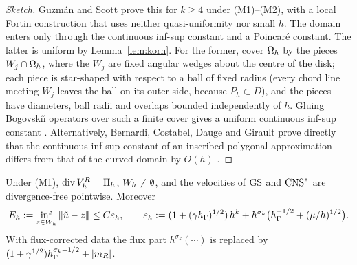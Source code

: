 \begin{proof}[Sketch]
Guzm\'an and Scott \cite[Theorem~1]{GuzmanScott2019} prove this for $k\ge4$ under (M1)--(M2), with a local Fortin construction that uses neither quasi-uniformity nor small $h$. The domain enters only through the continuous inf-sup constant and a Poincar\'e constant. The latter is uniform by Lemma~\ref{lem:korn}. For the former, cover $\Omega_h$ by the pieces $W_j\cap\Omega_h$, where the $W_j$ are fixed angular wedges about the centre of the disk; each piece is star-shaped with respect to a ball of fixed radius (every chord line meeting $W_j$ leaves the ball on its outer side, because $P_h\subset D$), and the pieces have diameters, ball radii and overlaps bounded independently of $h$. Gluing Bogovski\u{\i} operators over such a finite cover gives a uniform continuous inf-sup constant \cite{PadhiExt}. Alternatively, Bernardi, Costabel, Dauge and Girault prove directly that the continuous inf-sup constant of an inscribed polygonal approximation differs from that of the curved domain by $O(h)$ \cite[Theorem~4.6]{BCDG2016}. %
\end{proof}

\begin{lemma}\label{lem:approx}
Under (M1), $\operatorname{div}V_h^R=\Pi_h$, $W_h\ne\emptyset$, and the velocities of $\mathrm{GS}$ and $\mathrm{CNS}^\ast$ are divergence-free pointwise. Moreover
\[
E_h:=\inf_{z\in W_h}|\!|\!|\tilde u-z|\!|\!|\le C\varepsilon_h,\qquad \varepsilon_h:=(1+(\gamma h_\Gamma)^{1/2})\,h^k+h^{\sigma_k}\bigl(h_\Gamma^{-1/2}+(\mu/h)^{1/2}\bigr).
\]
With flux-corrected data the flux part $h^{\sigma_k}(\cdots)$ is replaced by $(1+\gamma^{1/2})h_\Gamma^{\sigma_k-1/2}+|m_R|$.
\end{lemma}

